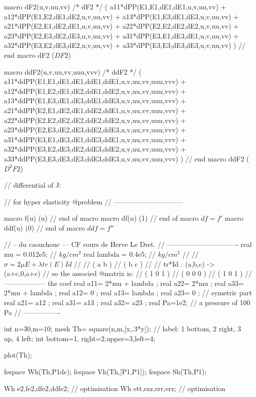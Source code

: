 \documentclass[twoside]{book}
\begin{document}
macro dF2(u,v,uu,vv)  /* dF2 */  (
       a11*dPP(E1,E1,dE1,dE1,u,v,uu,vv)
     + a12*dPP(E1,E2,dE1,dE2,u,v,uu,vv)
     + a13*dPP(E1,E3,dE1,dE3,u,v,uu,vv)
     + a21*dPP(E2,E1,dE2,dE1,u,v,uu,vv)
     + a22*dPP(E2,E2,dE2,dE2,u,v,uu,vv)
     + a23*dPP(E2,E3,dE2,dE3,u,v,uu,vv)
     + a31*dPP(E3,E1,dE3,dE1,u,v,uu,vv)
     + a32*dPP(E3,E2,dE3,dE2,u,v,uu,vv)
     + a33*dPP(E3,E3,dE3,dE3,u,v,uu,vv)
) // end macro dF2 ($D F2$)

macro ddF2(u,v,uu,vv,uuu,vvv)  /* ddF2 */  (
       a11*ddPP(E1,E1,dE1,dE1,ddE1,ddE1,u,v,uu,vv,uuu,vvv)
     + a12*ddPP(E1,E2,dE1,dE2,ddE1,ddE2,u,v,uu,vv,uuu,vvv)
     + a13*ddPP(E1,E3,dE1,dE3,ddE1,ddE3,u,v,uu,vv,uuu,vvv)
     + a21*ddPP(E2,E1,dE2,dE1,ddE2,ddE1,u,v,uu,vv,uuu,vvv)
     + a22*ddPP(E2,E2,dE2,dE2,ddE2,ddE2,u,v,uu,vv,uuu,vvv)
     + a23*ddPP(E2,E3,dE2,dE3,ddE2,ddE3,u,v,uu,vv,uuu,vvv)
     + a31*ddPP(E3,E1,dE3,dE1,ddE3,ddE1,u,v,uu,vv,uuu,vvv)
     + a32*ddPP(E3,E2,dE3,dE2,ddE3,ddE2,u,v,uu,vv,uuu,vvv)
     + a33*ddPP(E3,E3,dE3,dE3,ddE3,ddE3,u,v,uu,vv,uuu,vvv)
) // end macro ddF2  ($D^{2}  F2$)

//  differential of J: \hfilll

//  for hyper elasticity @problem  \hfilll
//  ------------------------------ \hfilll

macro f(u) (u) // end of macro  
macro df(u) (1) // end of macro  $df=f'$
macro ddf(u) (0) // end of macro $ddf=f''$

//  -- du caouchouc --- CF cours de Herve Le Dret. \hfilll
// ------------------------------- \hfilll
real mu = 0.012e5; //  $kg/cm^2$
real lambda =  0.4e5; //  $kg/cm^2$
//  \hfilll
//   $  \sigma = 2 \mu E + \lambda tr(E) Id $  \hfilll
//    \hfilll
//   ( a b )  \hfilll
//   ( b c )  \hfilll
//  \hfilll
//  tr*Id : (a,b,c) -> (a+c,0,a+c)  \hfilll
// so the associed @matrix is:  \hfilll
//   ( 1 0 1 )  \hfilll
//   ( 0 0 0 )  \hfilll
//   ( 1 0 1 )  \hfilll
// ------------------ the coef \hfilll
real a11= 2*mu +  lambda  ;
real a22= 2*mu ;
real a33= 2*mu +   lambda ;
real a12= 0 ;
real a13= lambda ;
real a23= 0 ;
//  symetric part
real a21= a12 ;
real a31= a13 ;
real a32= a23 ;
real Pa=1e2; //  a pressure of 100 Pa
// ----------------

int n=30,m=10;
mesh Th= square(n,m,[x,.3*y]); // label: 1 bottom, 2 right, 3 up, 4 left;
int bottom=1, right=2,upper=3,left=4;

plot(Th);
 
fespace Wh(Th,P1dc);
fespace Vh(Th,[P1,P1]);
fespace Sh(Th,P1);

Wh e2,fe2,dfe2,ddfe2; // optimisation 
Wh ett,ezz,err,erz; // optimisation 
\end{document}
